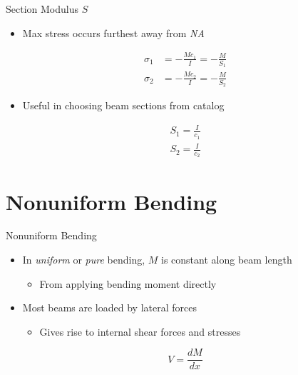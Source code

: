 \documentclass[10pt, svgnames]{beamer}
\begin{document}
\begin{frame}[label={sec:org04cf2c0}]{Section Modulus \(S\)}
\begin{itemize}
\item Max stress occurs furthest away from \emph{NA}
\end{itemize}

\begin{align*}
  \sigma_1 &= -\frac{Mc_1}{I} = -\frac{M}{S_1} \\
  \sigma_2 &= -\frac{Mc_2}{I} = -\frac{M}{S_2}
\end{align*}

\begin{itemize}
\item Useful in choosing beam sections from catalog
\end{itemize}

\begin{align*}
  S_{1} = \frac{I}{c_{1}} \\
  S_{2} = \frac{I}{c_{2}}
\end{align*}
\end{frame}

\section{Nonuniform Bending}
\label{nonuniform-bending}
\begin{frame}[label={sec:org4b67ff5}]{Nonuniform Bending}
\begin{itemize}
\item In \emph{uniform} or \emph{pure} bending, \(M\) is constant along beam length

\begin{itemize}
\item From applying bending moment directly
\end{itemize}

\item Most beams are loaded by lateral forces

\begin{itemize}
\item Gives rise to internal shear forces and stresses
\end{itemize}
\end{itemize}

\[V = \frac{dM}{dx}\]
\end{frame}
\end{document}
